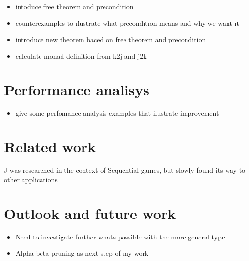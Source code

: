 \documentclass[runningheads]{llncs}
\begin{document}
\begin{Shaded}
\begin{Highlighting}[]
 \OtherTok{{-}\textgreater{}} 
\OtherTok{=}\OtherTok{{-}\textgreater{}} \OtherTok{=}
\end{Highlighting}
\end{Shaded}

\begin{itemize}
\tightlist
\item
  intoduce free theorem and precondition
\item
  counterexamples to ilustrate what precondition means and why we want
  it
\item
  introduce new theorem baced on free theorem and precondition
\item
  calculate monad definition from k2j and j2k
\end{itemize}

\section{Performance analisys}\label{performance-analisys}

\begin{itemize}
\tightlist
\item
  give some perfomance analysis examples that ilustrate improvement
\end{itemize}

\section{Related work}\label{related-work}

J was researched in the context of Sequential games, but slowly found
its way to other applications

\section{Outlook and future work}\label{outlook-and-future-work}

\begin{itemize}
\tightlist
\item
  Need to investigate further whats possible with the more general type
\item
  Alpha beta pruning as next step of my work
\end{itemize}
\end{document}

